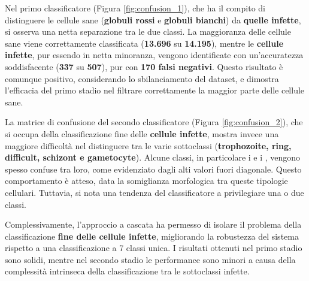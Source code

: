 \documentclass[minted, draw]{../tex/hebdomon}
\begin{document}
Nel primo classificatore (Figura \ref{fig:confusion_1}), che ha il compito di distinguere le cellule sane (\textbf{globuli rossi} e \textbf{globuli bianchi}) da \textbf{quelle infette}, si osserva una netta separazione tra le due classi. La maggioranza delle cellule sane viene correttamente classificata (\textbf{13.696} su \textbf{14.195}), mentre le \textbf{cellule infette}, pur essendo in netta minoranza, vengono identificate con un’accuratezza soddisfacente (\textbf{337} su \textbf{507}), pur con \textbf{170 falsi negativi}. Questo risultato è comunque positivo, considerando lo sbilanciamento del dataset, e dimostra l'efficacia del primo stadio nel filtrare correttamente la maggior parte delle cellule sane.

La matrice di confusione del secondo classificatore (Figura \ref{fig:confusion_2}), che si occupa della classificazione fine delle \textbf{cellule infette}, mostra invece una maggiore difficoltà nel distinguere tra le varie sottoclassi (\textbf{trophozoite, ring, difficult, schizont e gametocyte}). Alcune classi, in particolare i  e i , vengono spesso confuse tra loro, come evidenziato dagli alti valori fuori diagonale. Questo comportamento è atteso, data la somiglianza morfologica tra queste tipologie cellulari. Tuttavia, si nota una tendenza del classificatore a privilegiare una o due classi.

Complessivamente, l’approccio a cascata ha permesso di isolare il problema della classificazione \textbf{fine delle cellule infette}, migliorando la robustezza del sistema rispetto a una classificazione a 7 classi unica. I risultati ottenuti nel primo stadio sono solidi, mentre nel secondo stadio le performance sono minori a causa della complessità intrinseca della classificazione tra le sottoclassi infette.
\end{document}
